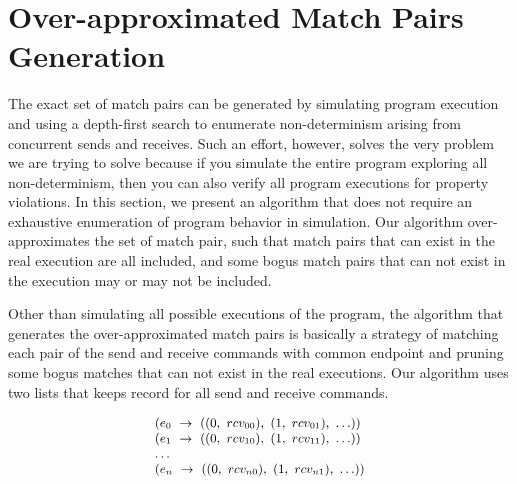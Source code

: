 

\section{ Over-approximated Match Pairs Generation}


The exact set of match pairs can be generated by simulating program execution and using a depth-first search to enumerate non-determinism arising from concurrent sends and receives. Such an effort, however, solves the very problem we are trying to solve because if you simulate the entire program exploring all non-determinism, then you can also verify all program executions for property violations. In this section, we present an algorithm that does not require an exhaustive enumeration of program behavior in simulation. Our algorithm over-approximates the set of match pair, such that match pairs that can exist in the real execution are all included, and some bogus match pairs that can not exist in the execution may or may not be included. %

Other than simulating all possible executions of the program, the algorithm that generates the over-approximated match pairs is basically a strategy of matching each pair of the send and receive commands with common endpoint and pruning some bogus matches that can not exist in the real executions. Our algorithm uses two lists that keeps record for all send and receive commands.

\begin{equation}
\footnotesize \begin{array}{l}
(e_0\ \rightarrow\ ((0,\ rcv_{00}),\ (1,\ rcv_{01}),\ \ldots))\\
(e_1\ \rightarrow\ ((0,\ rcv_{10}),\ (1,\ rcv_{11}),\ \ldots))\\
\ldots \\
(e_n\ \rightarrow\ ((0,\ rcv_{n0}),\ (1,\ rcv_{n1}),\ \ldots))\\
\end{array}
\label{equation:rcv}
\end{equation}

